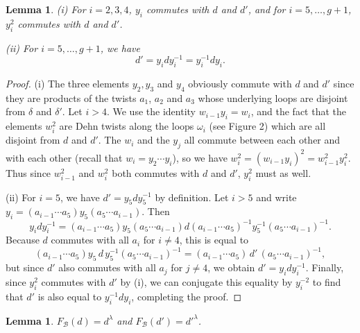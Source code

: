 \documentclass[a4paper,10pt,reqno]{amsart}
\newtheorem{lem}[thm]{Lemma}
\begin{document}
\begin{lem}\label{useful0}
(i) For $i=2,3,4$, $y_i$ commutes with $d$ and $d'$, and for $i=5,\ldots,g+1$, $y_i^2$ commutes
with $d$ and $d'$.

\vspace{.1cm}\noindent
(ii) For $i=5,\ldots,g+1$, we have
\begin{equation}\label{useful1}
d'=y_idy_i^{-1}=y_i^{-1}dy_i.
\end{equation}
\end{lem}

\begin{proof}

 (i) The three elements $y_2,y_3$ and $y_4$ obviously commute with
$d$ and $d'$ since they are products of the twists $a_1$, $a_2$ and $a_3$ whose underlying
loops are disjoint from $\delta$ and $\delta'$. Let $i>4$. 
We use the identity $w_{i-1}y_i=w_i$, and the fact that the
elements $w_i^2$ are Dehn twists along the loops $\omega_i$ (see Figure 2) which are 
all disjoint from $d$ and $d'$.  The $w_i$ and the $y_j$ all commute between each other
and with each other (recall that $w_i=y_2\cdots y_i$), so we have
$w_i^2=(w_{i-1}y_i)^2=w_{i-1}^2y_i^2$. Thus since $w_{i-1}^2$ and $w_i^2$ both 
commutes with $d$ and $d'$, $y_i^2$ must as well. 

\vspace{.1cm} \noindent (ii) For $i=5$, we have $d'=y_5dy_5^{-1}$ by definition. Let $i>5$
and write $y_i=(a_{i-1}\cdots a_5)y_5(a_5\cdots a_{i-1})$.
Then
$$y_idy_i^{-1}=(a_{i-1}\cdots a_5)y_5(a_5\cdots a_{i-1})d(a_{i-1}\cdots a_5)^{-1}y_5^{-1}(a_5\cdots a_{i-1})^{-1}.$$
Because $d$ commutes with all $a_i$ for $i\ne 4$, this is equal to
$$(a_{i-1}\cdots a_5)y_5\,d\,y_5^{-1}(a_5\cdots a_{i-1})^{-1}
=(a_{i-1}\cdots a_5)\,d'\, (a_5\cdots a_{i-1})^{-1},$$
but since $d'$ also commutes with all $a_j$ for $j\ne 4$, we obtain 
$d'=y_idy_i^{-1}$. Finally, since $y_i^2$ commutes with $d'$ by (i), we can conjugate this equality
by $y_i^{-2}$ to find that $d'$ is also equal to $y_i^{-1}dy_i$, completing the proof.
\end{proof}

\begin{lem}\label{FBddprime} $F_{\mathcal{B}}(d)=d^\lambda$ and $F_{\mathcal{B}}(d')={d'}^\lambda$.
\end{lem}
\end{document}
